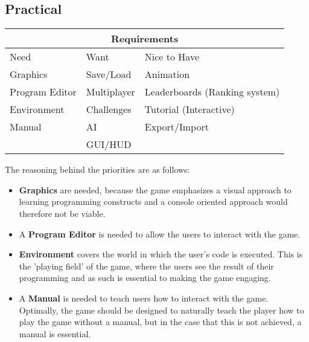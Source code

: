 \subsection*{Practical}
\begin{tabular}{|l|l|l|}
\hline
\multicolumn{3}{|c|}{Requirements}\\
\hline
Need & Want & Nice to Have\\
\hline
Graphics & Save/Load & Animation\\
Program Editor & Multiplayer & Leaderboards (Ranking system)\\
Environment & Challenges & Tutorial (Interactive)\\
Manual & AI & Export/Import\\
 & GUI/HUD & \\
\hline
\end{tabular}\newline

The reasoning behind the priorities are as follows:

\begin{itemize}
	\item \textbf{Graphics} are needed, because the game emphasizes a visual approach to learning programming constructs and a console oriented approach would therefore not be viable.
	\item A \textbf{Program Editor} is needed to allow the users to interact with the game.
	\item \textbf{Environment} covers the world in which the user's code is executed.
	This is the 'playing field' of the game, where the users see the result of their programming and as such is essential to making the game engaging.
	\item A \textbf{Manual} is needed to teach users how to interact with the game.
	Optimally, the game should be designed to naturally teach the player how to play the game without a manual, but in the case that this is not achieved, a manual is essential.
\end{itemize}

